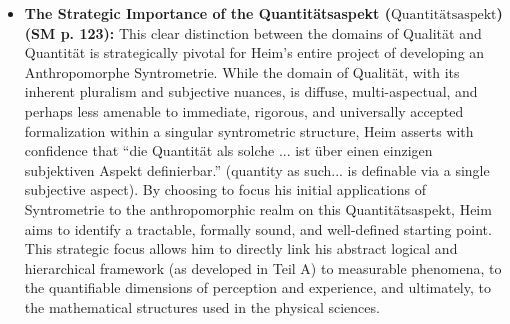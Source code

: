 \documentclass[12pt]{article}
\newcommand{\q}[1]{\enquote{#1}}
\newcommand{\quantitaetsaspekt}{\text{Quantitätsaspekt}}
\begin{document}
\begin{itemize}
\begin{enumerate}
        \item \textbf{Quantität (\(\quantitaetsaspekt\)) (Quantity)}: This domain, in contrast, refers to those aspects of human experience whose elements can be defined, compared, ordered, and related using the \textbf{Zahlenbegriff} (the concept of number) and the principles of measurement. This includes the consistent application of quantitative predicates, formulated in what Heim calls \textbf{Mengendialektik} (set dialectics). The dialetically shaped predicates of this quantity aspect can express either the equality of sets, \( \overline{|m|}_+ \equiv = \), or the inequality of sets, \( \overline{|m|}_- \equiv \neq \). Heim states that if \( a \neq b \), then there are two possibilities: either \(a\) is quantitatively larger than \(b\) (\(a > b\)), or vice versa (\(a < b\)). These quantitative aspects, unlike the qualitative ones, can, at least in principle, be unified and fully described \textit{within a single, specialized subjective aspect}—which he designates as the \textbf{Quantitätsaspekt (\(\quantitaetsaspekt\))}. This singular aspect dedicated to quantity is considered to be grounded in the well-established axioms of number theory and arithmetic.
    \end{enumerate}

    \item \textbf{The Strategic Importance of the Quantitätsaspekt (\(\quantitaetsaspekt\)) (SM p. 123):}
    This clear distinction between the domains of Qualität and Quantität is strategically pivotal for Heim's entire project of developing an Anthropomorphe Syntrometrie. While the domain of Qualität, with its inherent pluralism and subjective nuances, is diffuse, multi-aspectual, and perhaps less amenable to immediate, rigorous, and universally accepted formalization within a singular syntrometric structure, Heim asserts with confidence that \q{die Quantität als solche ... ist über einen einzigen subjektiven Aspekt definierbar.} (quantity as such... is definable via a single subjective aspect). By choosing to focus his initial applications of Syntrometrie to the anthropomorphic realm on this Quantitätsaspekt, Heim aims to identify a tractable, formally sound, and well-defined starting point. This strategic focus allows him to directly link his abstract logical and hierarchical framework (as developed in Teil A) to measurable phenomena, to the quantifiable dimensions of perception and experience, and ultimately, to the mathematical structures used in the physical sciences.
\end{itemize}
\end{document}
